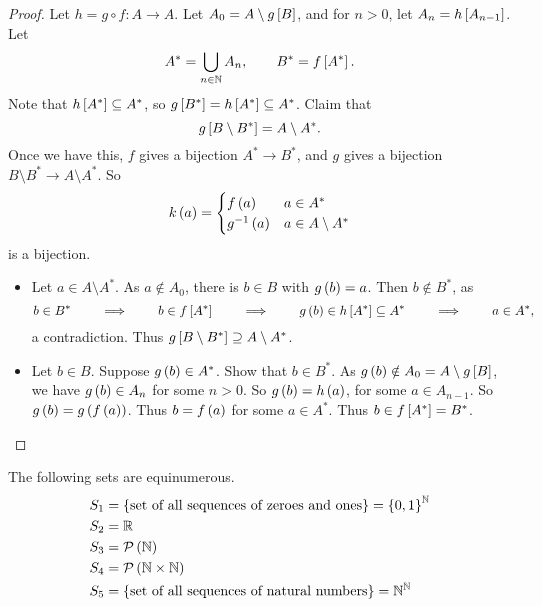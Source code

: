 \begin{proof}
Let $ h = g \circ f : A \to A $. Let $ A_0 = A \setminus g\sb{B} $, and for $ n > 0 $, let $ A_n = h\sb{A_{n - 1}} $. Let
$$ A^* = \bigcup_{n \in \N} A_n, \qquad B^* = f\sb{A^*}. $$
Note that $ h\sb{A^*} \subseteq A^* $, so $ g\sb{B^*} = h\sb{A^*} \subseteq A^* $. Claim that
$$ g\sb{B \setminus B^*} = A \setminus A^*. $$
Once we have this, $ f $ gives a bijection $ A^* \to B^* $, and $ g $ gives a bijection $ B \setminus B^* \to A \setminus A^* $. So
$$ k\rb{a} =
\begin{cases}
f\rb{a} & a \in A^* \\
g^{-1}\rb{a} & a \in A \setminus A^*
\end{cases}
$$
is a bijection.
\begin{itemize}
\item Let $ a \in A \setminus A^* $. As $ a \notin A_0 $, there is $ b \in B $ with $ g\rb{b} = a $. Then $ b \notin B^* $, as
$$ b \in B^* \qquad \implies \qquad b \in f\sb{A^*} \qquad \implies \qquad g\rb{b} \in h\sb{A^*} \subseteq A^* \qquad \implies \qquad a \in A^*, $$
a contradiction. Thus $ g\sb{B \setminus B^*} \supseteq A \setminus A^* $.
\item Let $ b \in B $. Suppose $ g\rb{b} \in A^* $. Show that $ b \in B^* $. As $ g\rb{b} \notin A_0 = A \setminus g\sb{B} $, we have $ g\rb{b} \in A_n $ for some $ n > 0 $. So $ g\rb{b} = h\rb{a} $, for some $ a \in A_{n - 1} $. So $ g\rb{b} = g\rb{f\rb{a}} $. Thus $ b = f\rb{a} $ for some $ a \in A^* $. Thus $ b \in f\sb{A^*} = B^* $.
\end{itemize}
\end{proof}

\begin{example1}
The following sets are equinumerous.
\begin{align*}
S_1 & = \cb{\text{set of all sequences of zeroes and ones}} = \cb{0, 1}^\N \\
S_2 & = \R \\
S_3 & = \mathcal{P}\rb{\N} \\
S_4 & = \mathcal{P}\rb{\N \times \N} \\
S_5 & = \cb{\text{set of all sequences of natural numbers}} = \N^\N
\end{align*}
\end{example1}

